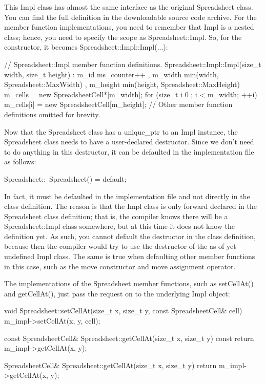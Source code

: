 This Impl class has almost the same interface as the original Spreadsheet class. You can find the full definition in the downloadable source code archive. For the member function implementations, you need to remember that Impl is a nested class; hence, you need to specify the scope as Spreadsheet::Impl. So, for the constructor, it becomes Spreadsheet::Impl::Impl(...):

\begin{cpp}
// Spreadsheet::Impl member function definitions.
Spreadsheet::Impl::Impl(size_t width, size_t height)
    : m_id { ms_counter++ }
    , m_width { min(width, Spreadsheet::MaxWidth) }
    , m_height { min(height, Spreadsheet::MaxHeight) }
{
    m_cells = new SpreadsheetCell*[m_width];
    for (size_t i { 0 }; i < m_width; ++i) {
        m_cells[i] = new SpreadsheetCell[m_height];
    }
}
// Other member function definitions omitted for brevity.
\end{cpp}

Now that the Spreadsheet class has a unique\_ptr to an Impl instance, the Spreadsheet class needs to have a user-declared destructor. Since we don’t need to do anything in this destructor, it can be defaulted in the implementation file as follows:

\begin{cpp}
Spreadsheet::~Spreadsheet() = default;
\end{cpp}

In fact, it must be defaulted in the implementation file and not directly in the class definition. The reason is that the Impl class is only forward declared in the Spreadsheet class definition; that is, the compiler knows there will be a Spreadsheet::Impl class somewhere, but at this time it does not know the definition yet. As such, you cannot default the destructor in the class definition, because then the compiler would try to use the destructor of the as of yet undefined Impl class. The same is true when defaulting other member functions in this case, such as the move constructor and move assignment operator.

The implementations of the Spreadsheet member functions, such as setCellAt() and getCellAt(), just pass the request on to the underlying Impl object:

\begin{cpp}
void Spreadsheet::setCellAt(size_t x, size_t y, const SpreadsheetCell& cell)
{
    m_impl->setCellAt(x, y, cell);
}

const SpreadsheetCell& Spreadsheet::getCellAt(size_t x, size_t y) const
{
    return m_impl->getCellAt(x, y);
}

SpreadsheetCell& Spreadsheet::getCellAt(size_t x, size_t y)
{
    return m_impl->getCellAt(x, y);
}
\end{cpp}


